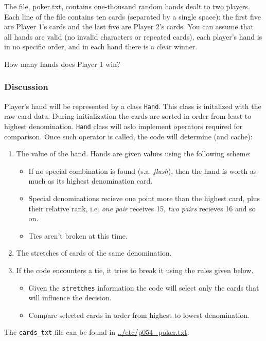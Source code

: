 \documentclass[11pt]{article}
\begin{document}
The file, poker.txt, contains one-thousand random hands dealt to two
players. Each line of the file contains ten cards (separated by a single
space): the first five are Player 1's cards and the last five are Player 2's
cards. You can assume that all hands are valid (no invalid characters or
repeated cards), each player's hand is in no specific order, and in each
hand there is a clear winner.

How many hands does Player 1 win?

\subsubsection{Discussion}
\label{sec:orgheadline15}
Player's hand will be represented by a class \texttt{Hand}.  This class is
initalized with the raw card data.  During initialization the cards are
sorted in order from least to highest denomination.  \texttt{Hand} class will aslo
implement operators required for comparison.  Once such operator is called,
the code will determine (and cache):

\begin{enumerate}
\item The value of the hand.  Hands are given values using the following scheme:
\begin{itemize}
\item If no special combination is found (s.a. \emph{flush}), then the hand is
worth as much as its highest denomination card.
\item Special denominations recieve one point more than the highest card,
plus their relative rank, i.e. \emph{one pair} receives 15, \emph{two pairs}
recieves 16 and so on.
\item Ties aren't broken at this time.
\end{itemize}
\item The stretches of cards of the same denomination.
\item If the code encounters a tie, it tries to break it using the rules given
below.
\begin{itemize}
\item Given the \texttt{stretches} information the code will select only the cards
that will influence the decision.
\item Compare selected cards in order from highest to lowest denomination.
\end{itemize}
\end{enumerate}

The \texttt{cards\_txt} file can be found in \url{../etc/p054_poker.txt}.
\end{document}
